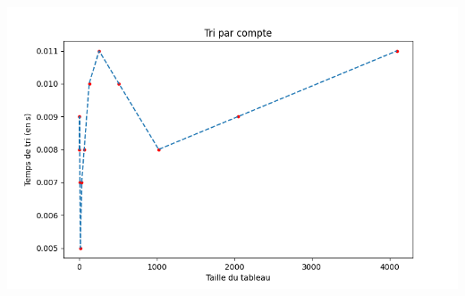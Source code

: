\documentclass[11pt,a4paper]{article}
\begin{document}
    \includegraphics[scale = 0.7]{../Courbes/Valeurs_triées_inversement_avec_répétitions/Tri par compte.png}
\end{document}
